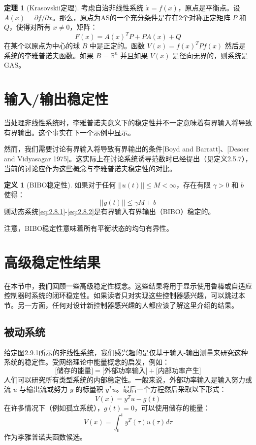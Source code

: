 \documentclass[UTF8,12pt,a4paper]{ctexart}
\theoremstyle{definition}
\newtheorem{definition}{定义}[section]
\newtheorem{theorem}{定理}[section]
\begin{document}
\begin{theorem}[Krasovskii定理]
考虑自治非线性系统 $\dot{x}=f(x)$，原点是平衡点。设 $A(x)=\partial f/\partial x$。那么，原点为AS的一个充分条件是存在2个对称正定矩阵 $P$ 和 $Q$，使得对所有 $x \neq 0$，矩阵：
\[
F(x) = A(x)^T P + PA(x) + Q
\]
在某个以原点为中心的球 $B$ 中是正定的。函数 $V(x)=f(x)^T P f(x)$ 然后是系统的李雅普诺夫函数。如果 $B=\mathbb{R}^n$ 并且如果 $V(x)$ 是径向无界的，则系统是GAS。
\end{theorem}

\section{输入/输出稳定性}

当处理非线性系统时，李雅普诺夫意义下的稳定性并不一定意味着有界输入将导致有界输出。这个事实在下一个示例中显示。

然而，我们需要讨论有界输入将导致有界输出的条件[Boyd and Barratt]、[Desoer and Vidyasagar 1975]。这实际上在讨论系统诱导范数时已经提出（见定义2.5.7），当前的讨论应作为这些概念与李雅普诺夫稳定性的对比。

\begin{definition}[BIBO稳定性]
如果对于任何 $||u(t)|| \leq M < \infty$，存在有限 $\gamma > 0$ 和 $b$ 使得：
\[
||y(t)|| \leq \gamma M + b
\]
则动态系统\eqref{eq:2.8.1}-\eqref{eq:2.8.2}是有界输入有界输出（BIBO）稳定的。
\end{definition}

注意，BIBO稳定性意味着所有平衡状态的均匀有界性。

\section{高级稳定性结果}

在本节中，我们回顾一些高级稳定性概念。这些结果将用于显示使用鲁棒或自适应控制器时系统的闭环稳定性。如果读者只对实现这些控制器感兴趣，可以跳过本节。另一方面，任何对设计新控制器感兴趣的人都应该了解这里介绍的结果。

\subsection{被动系统}

给定图2.9.1所示的非线性系统，我们感兴趣的是仅基于输入-输出测量来研究这种系统的稳定性。受网络理论中能量概念的启发，例如：
\[
\text{[储存的能量]} = \text{[外部功率输入]} + \text{[内部功率产生]}
\]
人们可以研究所有类型系统的内部稳定性。一般来说，外部功率输入是输入努力或流 $u$ 与输出流或努力 $y$ 的标量积 $y^T u$。最后一个方程然后采取以下形式：
\begin{equation}\label{eq:2.9.1}
\dot{V}(x) = y^T u - g(t)
\end{equation}
在许多情况下（例如孤立系统），$g(t)=0$，可以使用储存的能量：
\begin{equation}\label{eq:2.9.2}
V(x) = \int_0^t y^T(\tau)u(\tau) d\tau
\end{equation}
作为李雅普诺夫函数候选。
\end{document}
